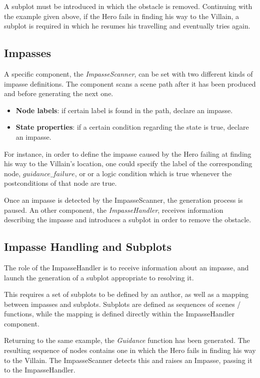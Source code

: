 \documentclass[12pt,a4paper,oneside]{report}
\begin{document}
A subplot must be introduced in which the obstacle is removed. Continuing with the example given above, if the Hero fails in finding his way to the Villain, a subplot is required in which he resumes his travelling and eventually tries again.

\subsection{Impasses}

A specific component, the \textit{ImpasseScanner}, can be set with two different kinds of impasse definitions. The component scans a scene path after it has been produced and before generating the next one.

\begin{itemize}\setlength{\itemsep}{0pt}
\item \textbf{Node labels}: if certain label is found in the path, declare an impasse.
\item \textbf{State properties}: if a certain condition regarding the state is true, declare an impasse.
\end{itemize}

For instance, in order to define the impasse caused by the Hero failing at finding his way to the Villain's location, one could specify the label of the corresponding node, \(guidance\_failure\), or or a logic condition which is true whenever the postconditions of that node are true.

Once an impasse is detected by the ImpasseScanner, the generation process is paused. An other component, the \textit{ImpasseHandler}, receives information describing the impasse and introduces a subplot in order to remove the obstacle.

\bigskip

\subsection{Impasse Handling and Subplots}
The role of the ImpasseHandler is to receive information about an impasse, and launch the generation of a subplot appropriate to resolving it.

This requires a set of subplots to be defined by an author, as well as a mapping between impasses and subplots. Subplots are defined as sequences of scenes / functions, while the mapping is defined directly within the ImpasseHandler component.

\bigskip

Returning to the same example, the \textit{Guidance} function has been generated. The resulting sequence of nodes contains one in which the Hero fails in finding his way to the Villain. The ImpasseScanner detects this and raises an Impasse, passing it to the ImpasseHandler.
\end{document}
